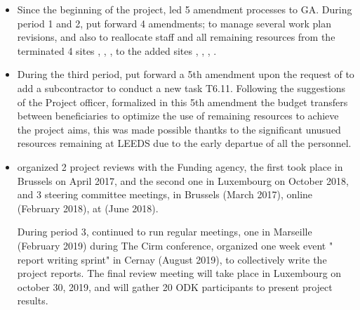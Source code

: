 \begin{itemize}
\item %

Since the beginning of the project,  led  5 amendment processes to GA. During period 1 and 2,  put forward 4 amendments; to manage several work plan revisions, and also to reallocate staff and all remaining resources from the terminated 4 sites , , ,  to the added  sites , , , .
\item During the third period,  put forward a 5th amendment upon the request of 
to add a subcontractor to conduct a new task T6.11. Following the suggestions of the Project officer,  formalized 
in this 5th amendment the budget transfers between beneficiaries to optimize the use of remaining resources to achieve the project aims, this was made possible thantks to the significant unusued resources remaining at LEEDS due to the early departue of all the personnel. 

\item {} organized 2 project reviews with the Funding agency, the first took place in Brussels on April 2017, and the second one in Luxembourg on October 2018, and 3 steering committee meetings, in Brussels (March 2017), online
  (February 2018),  at  (June 2018).
  
  During period 3,  continued to run regular meetings, one in Marseille (February 2019) during The Cirm conference, organized one week event " report writing sprint" in Cernay (August 2019), to collectively write the project reports.  The final review meeting will take place in Luxembourg on october 30, 2019, and will gather 20 ODK participants to present project results. 


\end{itemize}
